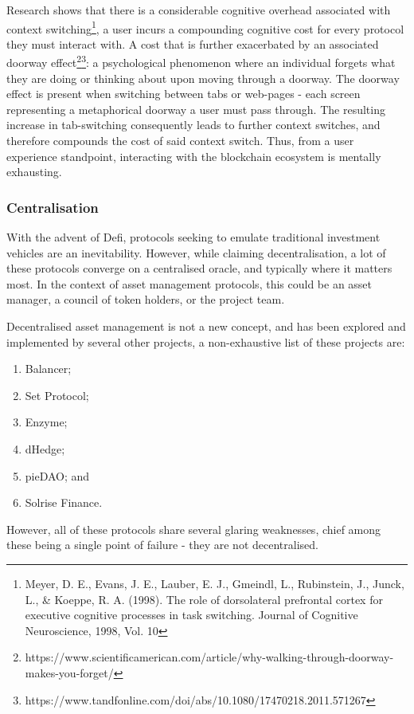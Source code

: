 \documentclass[10pt]{article}
\begin{document}
					Research shows that there is a considerable cognitive overhead
					associated with context switching\footnote[3]{Meyer, D. E., Evans, J.
					E., Lauber, E. J., Gmeindl, L., Rubinstein, J., Junck, L., \& Koeppe, R.
					A. (1998). The role of dorsolateral prefrontal cortex for executive
					cognitive processes in task switching. Journal of Cognitive
					Neuroscience, 1998, Vol. 10}, a user incurs a compounding cognitive cost
					for every protocol they must interact with. A cost that is further
					exacerbated by an associated doorway
					effect\footnote[4]{https://www.scientificamerican.com/article/why-walking-through-doorway-makes-you-forget/}\footnote[5]{https://www.tandfonline.com/doi/abs/10.1080/17470218.2011.571267}:
					a psychological phenomenon where an individual forgets what they are
					doing or thinking about upon moving through a doorway. The doorway
					effect is present when switching between tabs or web-pages - each screen
					representing a metaphorical doorway a user must pass through. The
					resulting increase in tab-switching consequently leads to further
					context switches, and therefore compounds the cost of said context
					switch. Thus, from a user experience standpoint, interacting with the
					blockchain ecosystem is mentally exhausting.
				\subsubsection{Centralisation}
					With the advent of Defi, protocols seeking to emulate traditional
					investment vehicles are an inevitability. However, while claiming
					decentralisation, a lot of these protocols converge on a centralised
					oracle, and typically where it matters most. In the context of asset
					management protocols, this could be an asset manager, a council of token
					holders, or the project team. 

					Decentralised asset management is not a new concept, and has been
					explored and implemented by several other projects, a non-exhaustive
					list of these projects are:
					\begin{enumerate}
						\item Balancer;
						\item Set Protocol;
						\item Enzyme;
						\item dHedge;
						\item pieDAO; and
						\item Solrise Finance.
					\end{enumerate}
					However, all of these protocols share several glaring weaknesses, chief 
					among these being a single point of failure - they are not
					decentralised.
\end{document}
